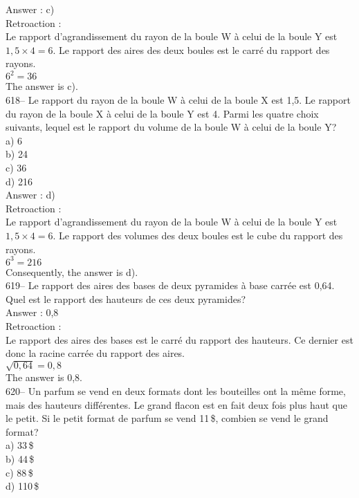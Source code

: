 ﻿\documentclass[letterpaper, 12pt]{article}
\begin{document}
Answer : c)\\

Retroaction : \\
Le rapport d'agrandissement du rayon de la boule W \`a celui de la boule Y
est $1,5\times4=6$.  Le rapport des aires des deux boules est le carr\'e du
rapport des rayons.\\
$6^{2}=36$\\
The answer is c).\\

618-- Le rapport du rayon de la boule W \`a celui de la boule X est 1,5.  Le
rapport du rayon de la boule X \`a celui de la boule Y est 4.  Parmi les
quatre choix suivants, lequel est le rapport du volume de la boule W \`a
celui de la boule Y?\\
a) 6\\
b) 24\\
c) 36\\
d) 216\\

Answer : d)\\

Retroaction : \\
Le rapport d'agrandissement du rayon de la boule W \`a celui de la boule Y
est $1,5\times4=6$.  Le rapport des volumes des deux boules est le cube du
rapport des rayons.\\
$6^{3}=216$  \\
Consequently, the answer is d).\\

619-- Le rapport des aires des bases de deux pyramides \`a base carr\'ee est
0,64.  Quel est le rapport des hauteurs de ces deux pyramides?\\

Answer : 0,8\\

Retroaction : \\
Le rapport des aires des bases est le carr\'e du rapport des hauteurs.  Ce
dernier est donc la racine carr\'ee du rapport des aires.  \\
$\sqrt{0,64}=0,8$  \\
The answer is 0,8.\\


620-- Un parfum se vend en deux formats dont les bouteilles ont la m\^eme
forme, mais des hauteurs diff\'erentes.  Le grand flacon est en fait deux
fois plus haut que le petit.  Si le petit format de parfum se vend 11\,\$,
combien se vend le grand format?\\
a) 33\,\$\\
b) 44\,\$\\
c) 88\,\$\\
d) 110\,\$\\
\end{document}
